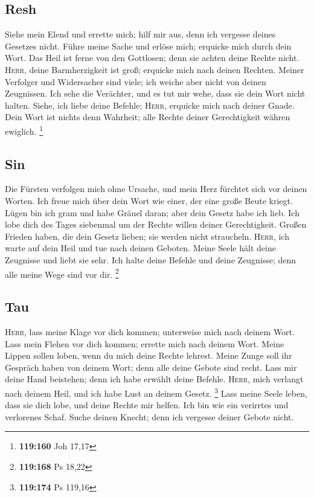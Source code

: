 \hypertarget{resh}{%
\subsection{Resh}\label{resh}}

 Siehe mein Elend und errette mich; hilf mir aus, denn
ich vergesse deines Gesetzes nicht.  Führe meine Sache
und erlöse mich; erquicke mich durch dein Wort.  Das
Heil ist ferne von den Gottlosen; denn sie achten deine Rechte nicht.
 \textsc{Herr}, deine Barmherzigkeit ist groß; erquicke
mich nach deinen Rechten.  Meiner Verfolger und
Widersacher sind viele; ich weiche aber nicht von deinen Zeugnissen.
 Ich sehe die Verächter, und es tut mir wehe, dass sie
dein Wort nicht halten.  Siehe, ich liebe deine Befehle;
\textsc{Herr}, erquicke mich nach deiner Gnade.  Dein
Wort ist nichts denn Wahrheit; alle Rechte deiner Gerechtigkeit währen
ewiglich. \footnote{\textbf{119:160} Joh 17,17}

\hypertarget{sin}{%
\subsection{Sin}\label{sin}}

 Die Fürsten verfolgen mich ohne Ursache, und mein Herz
fürchtet sich vor deinen Worten.  Ich freue mich über
dein Wort wie einer, der eine große Beute kriegt.  Lügen
bin ich gram und habe Gräuel daran; aber dein Gesetz habe ich lieb.
 Ich lobe dich des Tages siebenmal um der Rechte willen
deiner Gerechtigkeit.  Großen Frieden haben, die dein
Gesetz lieben; sie werden nicht straucheln. 
\textsc{Herr}, ich warte auf dein Heil und tue nach deinen Geboten.
 Meine Seele hält deine Zeugnisse und liebt sie sehr.
 Ich halte deine Befehle und deine Zeugnisse; denn alle
meine Wege sind vor dir. \footnote{\textbf{119:168} Ps 18,22}

\hypertarget{tau}{%
\subsection{Tau}\label{tau}}

 \textsc{Herr}, lass meine Klage vor dich kommen;
unterweise mich nach deinem Wort.  Lass mein Flehen vor
dich kommen; errette mich nach deinem Wort.  Meine
Lippen sollen loben, wenn du mich deine Rechte lehrest. 
Meine Zunge soll ihr Gespräch haben von deinem Wort; denn alle deine
Gebote sind recht.  Lass mir deine Hand beistehen; denn
ich habe erwählt deine Befehle.  \textsc{Herr}, mich
verlangt nach deinem Heil, und ich habe Lust an deinem Gesetz.
\footnote{\textbf{119:174} Ps 119,16}  Lass meine Seele
leben, dass sie dich lobe, und deine Rechte mir helfen. 
Ich bin wie ein verirrtes und verlorenes Schaf. Suche deinen Knecht;
denn ich vergesse deiner Gebote nicht.

